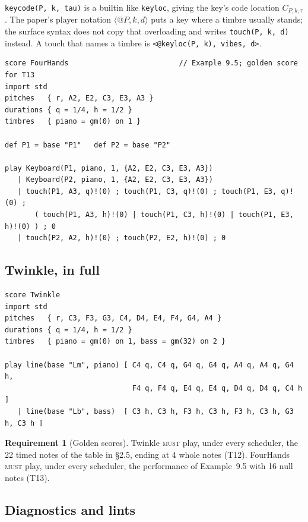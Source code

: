 \documentclass[11pt,a4paper]{article}
\theoremstyle{definition}
\newtheorem{requirement}{Requirement}[section]
\theoremstyle{remark}
\newcommand{\MUST}{\textsc{must}}
\begin{document}
\noindent \texttt{keycode(P, k, tau)} is a builtin like \texttt{keyloc}, giving
the key's code location $C_{P,k,\tau}$. The paper's player notation
$\langle @P,k,d\rangle$ puts a key where a timbre usually stands; the surface
syntax does not copy that overloading and writes \texttt{touch(P, k, d)}
instead. A touch that names a timbre is \texttt{<@keyloc(P, k), vibes, d>}.

\begin{lstlisting}[language=score]
score FourHands                          // Example 9.5; golden score for T13
import std
pitches   { r, A2, E2, C3, E3, A3 }
durations { q = 1/4, h = 1/2 }
timbres   { piano = gm(0) on 1 }

def P1 = base "P1"   def P2 = base "P2"

play Keyboard(P1, piano, 1, {A2, E2, C3, E3, A3})
   | Keyboard(P2, piano, 1, {A2, E2, C3, E3, A3})
   | touch(P1, A3, q)!(0) ; touch(P1, C3, q)!(0) ; touch(P1, E3, q)!(0) ;
       ( touch(P1, A3, h)!(0) | touch(P1, C3, h)!(0) | touch(P1, E3, h)!(0) ) ; 0
   | touch(P2, A2, h)!(0) ; touch(P2, E2, h)!(0) ; 0
\end{lstlisting}

\subsection{Twinkle, in full}

\begin{lstlisting}[language=score]
score Twinkle
import std
pitches   { r, C3, F3, G3, C4, D4, E4, F4, G4, A4 }
durations { q = 1/4, h = 1/2 }
timbres   { piano = gm(0) on 1, bass = gm(32) on 2 }

play line(base "Lm", piano) [ C4 q, C4 q, G4 q, G4 q, A4 q, A4 q, G4 h,
                              F4 q, F4 q, E4 q, E4 q, D4 q, D4 q, C4 h ]
   | line(base "Lb", bass)  [ C3 h, C3 h, F3 h, C3 h, F3 h, C3 h, G3 h, C3 h ]
\end{lstlisting}

\begin{requirement}[Golden scores]\label{req:golden}
Twinkle \MUST{} play, under every scheduler, the 22 timed notes of the table in
\S2.5, ending at 4 whole notes (T12). FourHands \MUST{} play, under every
scheduler, the performance of Example~9.5 with 16 null notes (T13).
\end{requirement}

\subsection{Diagnostics and lints}
\end{document}
